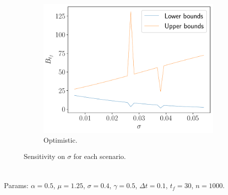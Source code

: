 \documentclass[11pt]{article}
\theoremstyle{definition}
\theoremstyle{remark}
\theoremstyle{remark}
\begin{document}
\begin{figure}[H]
\begin{subfigure}[b]{0.45\textwidth}
      \includegraphics[scale=0.45]{sens_optimistic.pdf}
      \caption{Optimistic.}
  \end{subfigure}
  \caption{Sensitivity on $\sigma$ for each scenario.}
\end{figure}

\section{}
Params: $\alpha = 0.5$, $\mu = 1.25$, $\sigma = 0.4$, $\gamma = 0.5$, $\Delta t = 0.1$, $t_f = 30$, $n = 1000$.


\printbibliography
\end{document}
